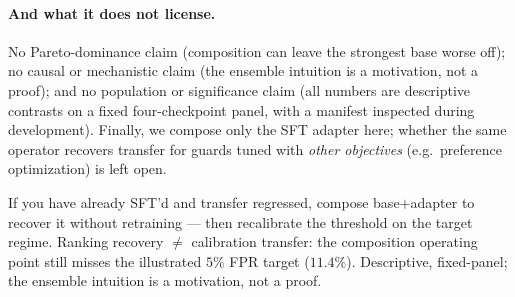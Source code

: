 \paragraph{And what it does not license.}
No Pareto-dominance claim (composition can leave the strongest base worse off); no causal or
mechanistic claim (the ensemble intuition is a motivation, not a proof); and no population or
significance claim (all numbers are descriptive contrasts on a fixed four-checkpoint panel, with a
manifest inspected during development). Finally, we compose only the SFT adapter here; whether the same
operator recovers transfer for guards tuned with \emph{other objectives} (e.g.\ preference optimization)
is left open.

{If you have already SFT'd and transfer regressed, compose base$+$adapter to recover it without
retraining --- then recalibrate the threshold on the target regime.}
{Ranking recovery $\neq$ calibration transfer: the composition operating point still misses the
illustrated $5\%$ FPR target ($11.4\%$). Descriptive, fixed-panel; the ensemble intuition is a
motivation, not a proof.}
